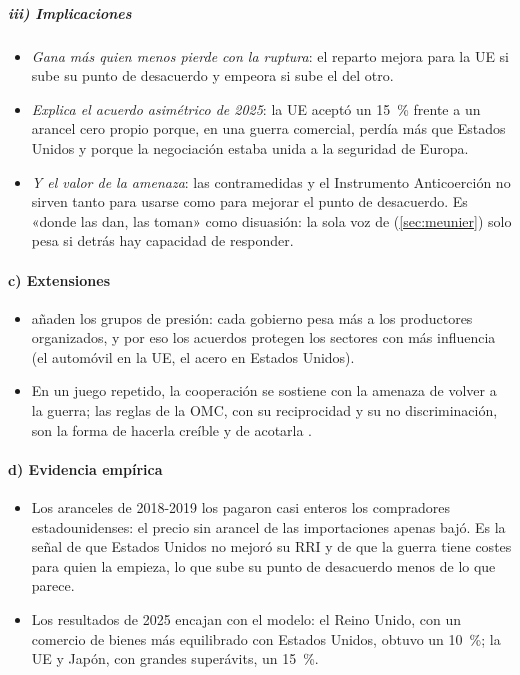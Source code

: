 \documentclass[11pt]{article}
\begin{document}
\subparagraph{iii) Implicaciones}

\begin{itemize}
\item \emph{Gana más quien menos pierde con la ruptura}: el reparto mejora para la UE si sube su punto de desacuerdo y empeora si sube el del otro.
\item \emph{Explica el acuerdo asimétrico de 2025}: la UE aceptó un 15~\% frente a un arancel cero propio porque, en una guerra comercial, perdía más que Estados Unidos y porque la negociación estaba unida a la seguridad de Europa.
\item \emph{Y el valor de la amenaza}: las contramedidas y el Instrumento Anticoerción no sirven tanto para usarse como para mejorar el punto de desacuerdo. Es «donde las dan, las toman» como disuasión: la sola voz de  (\ref{sec:meunier}) solo pesa si detrás hay capacidad de responder.
\end{itemize}

\paragraph{c) Extensiones}

\begin{itemize}
\item \textcite{GrossmanHelpman1995TradeWars} añaden los grupos de presión: cada gobierno pesa más a los productores organizados, y por eso los acuerdos protegen los sectores con más influencia (el automóvil en la UE, el acero en Estados Unidos).
\item En un juego repetido, la cooperación se sostiene con la amenaza de volver a la guerra; las reglas de la OMC, con su reciprocidad y su no discriminación, son la forma de hacerla creíble y de acotarla .
\end{itemize}

\paragraph{d) Evidencia empírica}

\begin{itemize}
\item Los aranceles de 2018-2019 los pagaron casi enteros los compradores estadounidenses: el precio sin arancel de las importaciones apenas bajó\nocite{Amiti2019Aranceles,Fajgelbaum2020Proteccionismo}. Es la señal de que Estados Unidos no mejoró su RRI y de que la guerra tiene costes para quien la empieza, lo que sube su punto de desacuerdo menos de lo que parece.
\item Los resultados de 2025 encajan con el modelo: el Reino Unido, con un comercio de bienes más equilibrado con Estados Unidos, obtuvo un 10~\%; la UE y Japón, con grandes superávits, un 15~\%.
\end{itemize}
\end{document}
